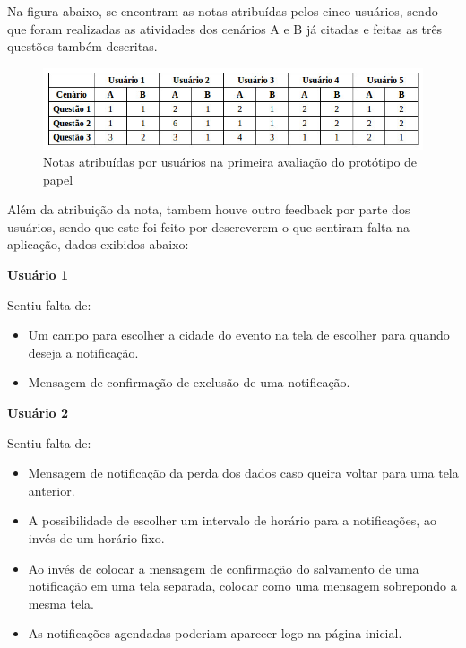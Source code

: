         Na figura abaixo, se encontram as notas atribuídas pelos cinco usuários, sendo que foram realizadas as atividades dos cenários A e B já citadas e 
        feitas as três questões também descritas.
        
        
        
        
        \begin{figure}[!htb]
        \centering
        \includegraphics[scale=0.6]{figuras/nota1avaliacao.jpg}
        \caption{Notas atribuídas por usuários na primeira avaliação do protótipo de papel}
        \end{figure}
        
        
        
             
        
	Além da atribuição da nota, tambem houve outro feedback por parte dos usuários, sendo que este foi feito por descreverem o que sentiram falta na aplicação, 
	dados exibidos abaixo:
	
	\textbf{Usuário 1}
	
	Sentiu falta de:
	
	 \begin{itemize}
       \item Um campo para escolher a cidade do evento na tela de escolher para quando deseja a notificação.

       \item Mensagem de confirmação de exclusão de uma notificação.
       
        \end{itemize}
	
	
	\textbf{Usuário 2}
	
	Sentiu falta de:
	
	\begin{itemize}
       \item Mensagem de notificação da perda dos dados caso queira voltar para uma tela anterior.

       \item A possibilidade de escolher um intervalo de horário para a notificações, ao invés de um horário fixo.
       
       \item Ao invés de colocar a mensagem de confirmação do salvamento de uma notificação em uma tela separada, colocar como uma mensagem sobrepondo a mesma tela.

       \item As notificações agendadas poderiam aparecer logo na página inicial.
       
        \end{itemize}
	
